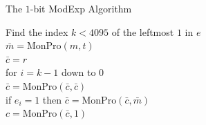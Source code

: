 \documentclass[xcolor=dvipsnames]{beamer}
\begin{document}
\begin{frame}{The $1$-bit ModExp Algorithm}

\hspace*{2em} Find the index $k<4095$ of the leftmost $1$ in $e$ \\
\hspace*{2em} $\bar{m}=\mbox{MonPro}(m,t)$ \\
\hspace*{2em} $\bar{c}=r$ \\
\hspace*{2em} for $i=k-1$ down to $0$ \\
\hspace*{2em} \hspace*{2em} $\bar{c}=\mbox{MonPro}(\bar{c},\bar{c})$ \\
\hspace*{2em} \hspace*{2em} if $e_i=1$ then $\bar{c}=\mbox{MonPro}(\bar{c},\bar{m})$ \\
\hspace*{2em} $c=\mbox{MonPro}(\bar{c},1)$

\end{frame}
\end{document}
